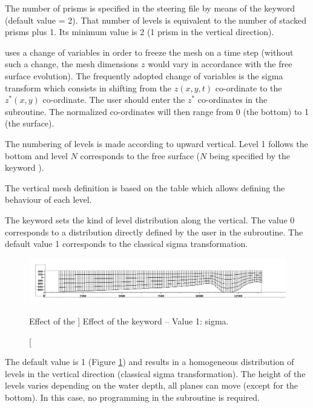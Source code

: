 The number of prisms is specified in the steering file by means of the keyword
 (default value = 2). That number of levels
is equivalent to the number of stacked prisms plus 1. Its minimum value is 2 (1
prism in the vertical direction).

 uses a change of variables in order to freeze the mesh on a time
step (without such a change, the mesh dimensions $z$ would vary in
accordance with the free surface evolution). The frequently adopted change of
variables is the sigma transform which consists in shifting from the $z(x,y,t)$
co-ordinate to the $z^{*} (x,y)$ co-ordinate.
The user should enter the $z^{*}$ co-ordinates in the 
subroutine.
The normalized co-ordinates will then range from 0 (the bottom) to 1 (the surface).

The numbering of levels is made according to upward vertical. Level 1 follows
the bottom and level $N$ corresponds to the free surface ($N$
being specified by the keyword ).

The vertical mesh definition is based on the  table which
allows defining the behaviour of each level.

The keyword  sets the kind of level distribution
along the vertical. The value 0 corresponds to a distribution directly defined
by the user in the  subroutine.
The default value 1 corresponds to the classical sigma transformation.

\begin{figure}[H]%
\begin{center}
%
  \includegraphics[width=\textwidth]{./graphics/mesh_transformation}
%
\end{center}
\caption
[Effect of the ]
{Effect of the  keyword -- Value 1: sigma.}
\label{fig:mesh_transf}
\end{figure}

The default value is 1 (Figure \ref{fig:mesh_transf}) and results in a
homogeneous distribution of levels in the vertical direction (classical sigma
transformation). The height of the levels varies depending on the water depth,
all planes can move (except for the bottom). In this case, no programming in
the  subroutine is required.

